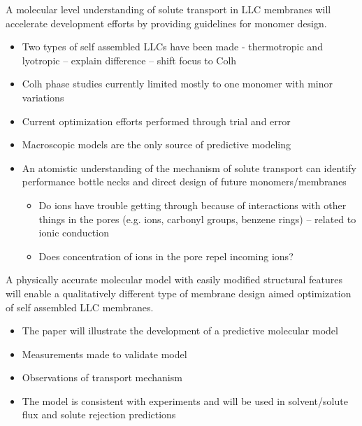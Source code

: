\documentclass{article}
\begin{document}
	A molecular level understanding of solute transport in LLC membranes will accelerate development efforts by providing guidelines for monomer design.
	\begin{itemize}
		\item Two types of self assembled LLCs have been made - thermotropic and lyotropic -- explain difference -- shift focus to Colh
		\item Colh phase studies currently limited mostly to one monomer with minor variations
		\item Current optimization efforts performed through trial and error
		\item Macroscopic models are the only source of predictive modeling
		\item An atomistic understanding of the mechanism of solute transport can identify
		performance bottle necks and direct design of future monomers/membranes
		\begin{itemize}
			\item Do ions have trouble getting through because of interactions with other things in the pores (e.g. ions, carbonyl groups, benzene rings) -- related to ionic conduction
			\item Does concentration of ions in the pore repel incoming ions?
		\end{itemize}
	\end{itemize}
	A physically accurate molecular model with easily modified structural features will enable a qualitatively different type of membrane design aimed optimization of self assembled LLC membranes.
	\begin{itemize}
		\item The paper will illustrate the development of a predictive molecular model
		\item Measurements made to validate model
		\item Observations of transport mechanism
		\item The model is consistent with experiments and will be used in solvent/solute flux and solute rejection predictions
	\end{itemize}
	
\end{document}
